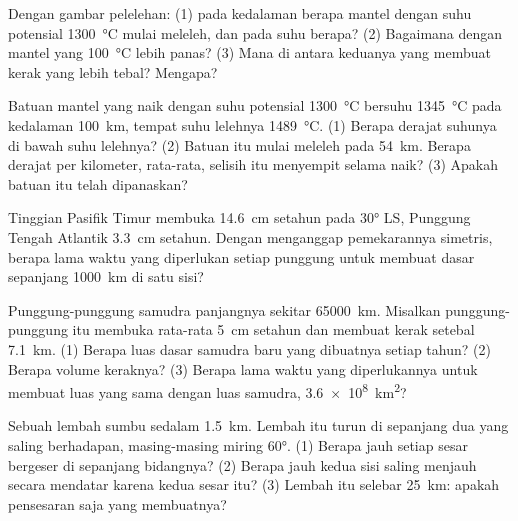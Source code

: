 \begin{exercise}[$\star\star$]\label{exo:g11:ocean-ridges:6}
Dengan gambar pelelehan: (1) pada kedalaman berapa mantel dengan suhu potensial
\qty{1300}{\celsius} mulai meleleh, dan pada suhu berapa? (2) Bagaimana dengan
mantel yang \qty{100}{\celsius} lebih panas? (3) Mana di antara keduanya yang
membuat kerak yang lebih tebal? Mengapa?
\end{exercise}

\begin{exercise}[$\star\star$]\label{exo:g11:ocean-ridges:7}
Batuan mantel yang naik dengan suhu potensial \qty{1300}{\celsius} bersuhu
\qty{1345}{\celsius} pada kedalaman \qty{100}{km}, tempat suhu lelehnya
\qty{1489}{\celsius}. (1) Berapa derajat suhunya di bawah suhu lelehnya?
(2) Batuan itu mulai meleleh pada \qty{54}{km}. Berapa derajat per kilometer,
rata-rata, selisih itu menyempit selama naik? (3) Apakah batuan itu telah
dipanaskan?
\end{exercise}

\begin{exercise}[$\star\star$]\label{exo:g11:ocean-ridges:8}
Tinggian Pasifik Timur membuka \qty{14.6}{cm} setahun pada \ang{30} LS,
Punggung Tengah Atlantik \qty{3.3}{cm} setahun. Dengan menganggap pemekarannya
simetris, berapa lama waktu yang diperlukan setiap punggung untuk membuat dasar
sepanjang \qty{1000}{km} di satu sisi?
\end{exercise}

\begin{exercise}[$\star\star$]\label{exo:g11:ocean-ridges:9}
Punggung-punggung samudra panjangnya sekitar \qty{65000}{km}. Misalkan
punggung-punggung itu membuka rata-rata \qty{5}{cm} setahun dan membuat kerak
setebal \qty{7.1}{km}. (1) Berapa luas dasar samudra baru yang dibuatnya setiap
tahun? (2) Berapa volume keraknya? (3) Berapa lama waktu yang diperlukannya
untuk membuat luas yang sama dengan luas samudra,
\qty{3.6e8}{km^2}?
\end{exercise}

\begin{exercise}[$\star\star$]\label{exo:g11:ocean-ridges:10}
Sebuah lembah sumbu sedalam \qty{1.5}{km}. Lembah itu turun di sepanjang dua
 yang saling berhadapan, masing-masing miring \ang{60}. (1) Berapa
jauh setiap sesar bergeser di sepanjang bidangnya? (2) Berapa jauh kedua sisi
saling menjauh secara mendatar karena kedua sesar itu? (3) Lembah itu selebar
\qty{25}{km}: apakah pensesaran saja yang membuatnya?
\end{exercise}

